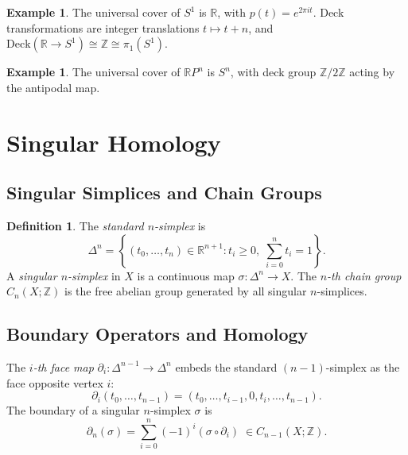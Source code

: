 \documentclass[12pt,a4paper]{amsart}
\theoremstyle{definition}
\newtheorem{definition}[theorem]{Definition}
\newtheorem{example}[theorem]{Example}
\begin{document}
\begin{example}
The universal cover of $S^1$ is $\mathbb{R}$, with $p(t) = e^{2\pi i t}$.
Deck transformations are integer translations $t \mapsto t + n$, and
$\mathrm{Deck}(\mathbb{R} \to S^1) \cong \mathbb{Z} \cong \pi_1(S^1)$.
\end{example}

\begin{example}
The universal cover of $\mathbb{R}P^n$ is $S^n$, with deck group
$\mathbb{Z}/2\mathbb{Z}$ acting by the antipodal map.
\end{example}

\section{Singular Homology}
\label{sec:homology}

\subsection{Singular Simplices and Chain Groups}

\begin{definition}
The \emph{standard $n$-simplex} is
\[
  \Delta^n = \left\{ (t_0, \ldots, t_n) \in \mathbb{R}^{n+1}
    : t_i \geq 0,\; \sum_{i=0}^n t_i = 1 \right\}.
\]
A \emph{singular $n$-simplex} in $X$ is a continuous map
$\sigma\colon \Delta^n \to X$.
The \emph{$n$-th chain group} $C_n(X;\mathbb{Z})$ is the free abelian group
generated by all singular $n$-simplices.
\end{definition}

\subsection{Boundary Operators and Homology}

The \emph{$i$-th face map} $\partial_i\colon \Delta^{n-1} \to \Delta^n$
embeds the standard $(n-1)$-simplex as the face opposite vertex $i$:
\[
  \partial_i(t_0,\ldots,t_{n-1}) = (t_0,\ldots,t_{i-1}, 0, t_i, \ldots, t_{n-1}).
\]
The boundary of a singular $n$-simplex $\sigma$ is
\[
  \partial_n(\sigma) = \sum_{i=0}^n (-1)^i (\sigma \circ \partial_i)
  \;\in C_{n-1}(X;\mathbb{Z}).
\]
\end{document}
